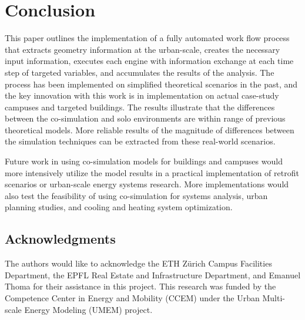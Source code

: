 \documentclass{tBPS2e}
\theoremstyle{plain}
\theoremstyle{definition}
\theoremstyle{remark}
\begin{document}
\section{Conclusion}
This paper outlines the implementation of a fully automated work flow
process that extracts geometry information at the
urban-scale, creates the necessary input information, executes each engine
with information exchange at each time step of targeted variables, and
accumulates the results of the analysis. The process has been implemented on
simplified theoretical scenarios in the past, and the key innovation with this
work is in implementation on actual case-study campuses and targeted
buildings. The results illustrate that the differences between the co-simulation 
and solo environments are within range of previous theoretical
models. More reliable results of the magnitude of differences between the
simulation techniques can be extracted from these real-world scenarios. 

Future work in using co-simulation models for buildings and campuses would
more intensively utilize the model results in a practical implementation of
retrofit scenarios or urban-scale energy systems research. More implementations would 
also test the feasibility of using co-simulation for systems analysis, urban planning studies, and
cooling and heating system optimization.

\subsection{Acknowledgments}
The authors would like to acknowledge the ETH Z\"urich Campus Facilities
Department, the EPFL Real Estate and Infrastructure Department, and Emanuel
Thoma for their assistance in this project. This research was funded by the
Competence Center in Energy and Mobility (CCEM) under the Urban Multi-scale
Energy Modeling (UMEM) project. 



\end{document}
